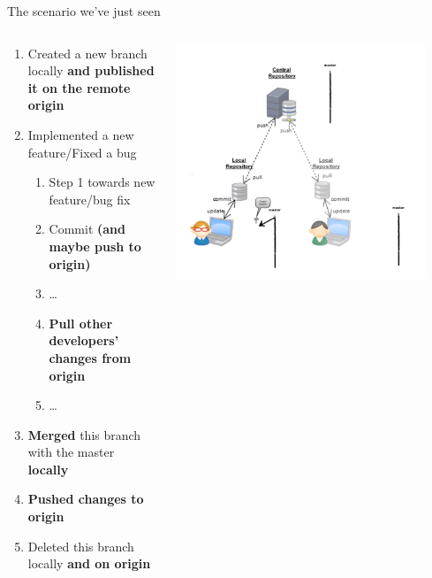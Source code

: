 
\begin{frame}[fragile]{The scenario we've just seen}
\begin{columns}
\begin{column}{0.6\textwidth}
	\tiny
	\begin{enumerate}
		\item<1-2> Created a new branch locally \textbf{and published it on the remote origin}
		\item<3-4> Implemented a new feature/Fixed a bug
		\begin{enumerate}
			\tiny
			\item<3> Step 1 towards new feature/bug fix
			\item<3> Commit \textbf{(and maybe push to origin)}
			\item<3> \ldots
			\item<4> \textbf{Pull other developers' changes from origin}
			\item<4> \ldots
		\end{enumerate}
		\item<5> \textbf{Merged} this branch with the master \textbf{locally}
		\item<6> \textbf{Pushed changes to origin}
		\item<7-> Deleted this branch locally \textbf{and on origin}
	\end{enumerate}
\end{column}
\begin{column}{0.4\textwidth}
	\begin{center}
			 {
				\includegraphics[width=0.9\textwidth]{multiuser_local_branch}
}
\end{center}
\end{column}
\end{columns}
\end{frame}
